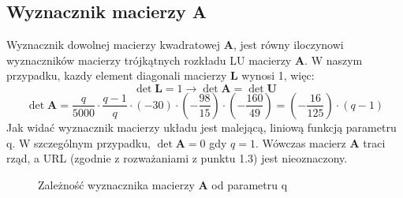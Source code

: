 \documentclass[a4paper]{article}
\begin{document}
\subsection{Wyznacznik macierzy A}
Wyznacznik dowolnej macierzy kwadratowej \textbf{A}, jest równy iloczynowi wyznaczników macierzy trójkątnych rozkładu LU macierzy \textbf{A}. W naszym przypadku, kazdy element diagonali macierzy \textbf{L} wynosi 1, więc:
$$
\det \textbf{L} = 1 \to \det \textbf{A} = \det \textbf{U}
$$
$$\det \textbf{A} = \frac{q}{5000} \cdot \frac{q-1}{q} \cdot (-30) \cdot (-\frac{98}{15}) \cdot (-\frac{160}{49}) = (-\frac{16}{125}) \cdot (q-1)
$$
Jak widać wyznacznik macierzy układu jest malejącą, liniową funkcją parametru q. W szczególnym przypadku, $\det \textbf{A} = 0$ gdy $q=1$. Wówczas macierz \textbf{A} traci rząd, a URL (zgodnie z rozważaniami z punktu 1.3) jest nieoznaczony.
\begin{figure}[h]
\centering
\caption{Zależność wyznacznika macierzy \textbf{A} od parametru q}
\label{fig:}
\end{figure}
\end{document}
